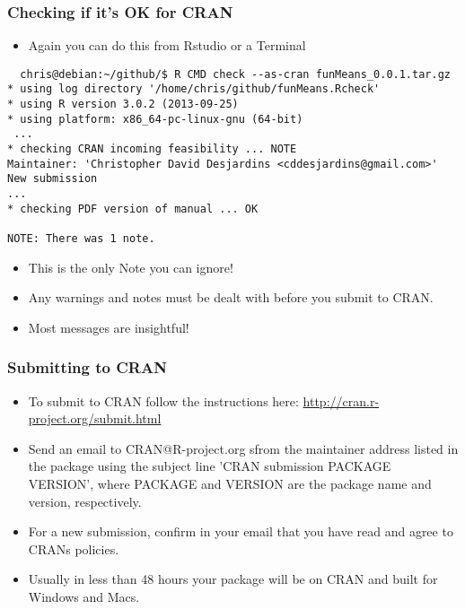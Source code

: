 \documentclass[xcolor=svgnames]{beamer}
\begin{document}
\begin{frame}[fragile]
\frametitle{Checking if it's OK for CRAN}  
\begin{itemize}
  \item Again you can do this from Rstudio or a Terminal
\end{itemize}
    \begin{scriptsize}
\begin{verbatim}
  chris@debian:~/github/$ R CMD check --as-cran funMeans_0.0.1.tar.gz
* using log directory '/home/chris/github/funMeans.Rcheck'
* using R version 3.0.2 (2013-09-25)
* using platform: x86_64-pc-linux-gnu (64-bit)
 ...
* checking CRAN incoming feasibility ... NOTE
Maintainer: 'Christopher David Desjardins <cddesjardins@gmail.com>'
New submission
...
* checking PDF version of manual ... OK

NOTE: There was 1 note.
\end{verbatim}
\end{scriptsize}
\begin{itemize}
  \item This is the only Note you can ignore!
    \item Any warnings and notes must be dealt with before you submit to CRAN.
      \item Most messages are insightful!
\end{itemize}
\end{frame}

\begin{frame}
  \frametitle{Submitting to CRAN}
  \begin{itemize}
  \item To submit to CRAN follow the instructions here: \url{http://cran.r-project.org/submit.html}
  \item Send an email to CRAN@R-project.org sfrom the maintainer address listed in the package using the subject line 'CRAN submission PACKAGE VERSION', where PACKAGE and VERSION are the package name and version, respectively. 
  \item For a new submission, confirm in your email that you have read and agree to CRANs policies.
    \item Usually in less than 48 hours your package will be on CRAN and built for Windows and Macs.
  \end{itemize}
\end{frame}

\begin{frame}
  \frametit
\end{frame}
\end{document}
